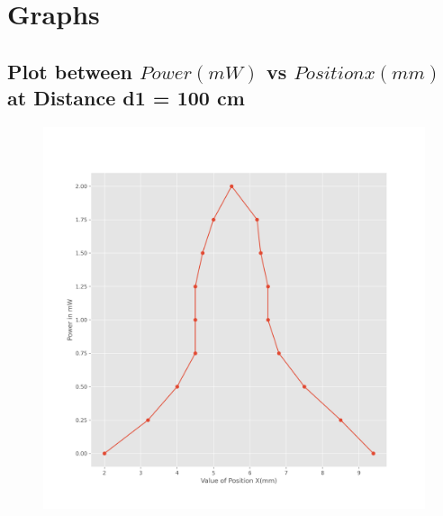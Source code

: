 \documentclass[11pt]{article}
\begin{document}
	\section{Graphs}
\subsection{Plot between $\textit{Power} (mW)$ vs $\textit{Position} x(mm)$ at Distance d1 = 100 cm}
\begin{figure}[H]
	\centering
	\includegraphics[scale=0.6]{fig.png}
	\label{it}
\end{figure}
\end{document}
